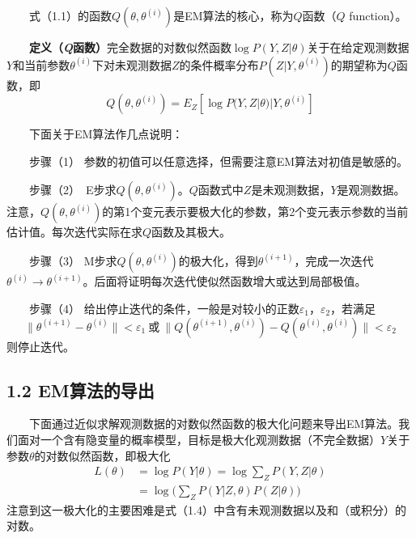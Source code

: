 \documentclass[
  12pt,
]{article}
\begin{document}
　　式（1.1）的函数\(Q(\theta,\theta^{(i)})\)是EM算法的核心，称为\(Q\)函数（\(Q\)
function）。

　　\textbf{定义（\emph{Q}函数）}完全数据的对数似然函数\(\log{P(Y,Z|\theta)}\)关于在给定观测数据\(Y\)和当前参数\(\theta^{(i)}\)下对未观测数据\(Z\)的条件概率分布\(P(Z|Y,\theta^{(i)})\)的期望称为\(Q\)函数，即
\[
Q(\theta,\theta^{(i)})=
E_Z[\log{P(Y,Z|\theta)|Y,\theta^{(i)}}]
\tag{1.3}
\]

　　下面关于EM算法作几点说明：

　　步骤（1） 参数的初值可以任意选择，但需要注意EM算法对初值是敏感的。

　　步骤（2）~E步求\(Q(\theta,\theta^{(i)})\)。\(Q\)函数式中\(Z\)是未观测数据，\(Y\)是观测数据。注意，\(Q(\theta,\theta^{(i)})\)的第1个变元表示要极大化的参数，第2个变元表示参数的当前估计值。每次迭代实际在求\(Q\)函数及其极大。

　　步骤（3）
M步求\(Q(\theta,\theta^{(i)})\)的极大化，得到\(\theta^{(i+1)}\)，完成一次迭代\(\theta^{(i)}\rightarrow\theta^{(i+1)}\)。后面将证明每次迭代使似然函数增大或达到局部极值。

　　步骤（4）
给出停止迭代的条件，一般是对较小的正数\(\varepsilon_1\)，\(\varepsilon_2\)，若满足
\[
\|\theta^{(i+1)}-\theta^{(i)}\|<\varepsilon_1\ 或\ \|Q(\theta^{(i+1)},\theta^{(i)})-Q(\theta^{(i)},\theta^{(i)})\|<\varepsilon_2
\] 则停止迭代。

\hypertarget{emux7b97ux6cd5ux7684ux5bfcux51fa}{%
\subsection{1.2 EM算法的导出}\label{emux7b97ux6cd5ux7684ux5bfcux51fa}}

　　下面通过近似求解观测数据的对数似然函数的极大化问题来导出EM算法。我们面对一个含有隐变量的概率模型，目标是极大化观测数据（不完全数据）\(Y\)关于参数\(\theta\)的对数似然函数，即极大化
\[
\begin{split}
L(\theta)&=\log{P(Y|\theta)}=\log{\sum_{Z}{P(Y,Z|\theta)}}\\
&=\log{\bigg(\sum_{Z}{P(Y|Z,\theta)P(Z|\theta)}\bigg)}
\end{split}
\tag{1.4}
\]
注意到这一极大化的主要困难是式（1.4）中含有未观测数据以及和（或积分）的对数。
\end{document}
